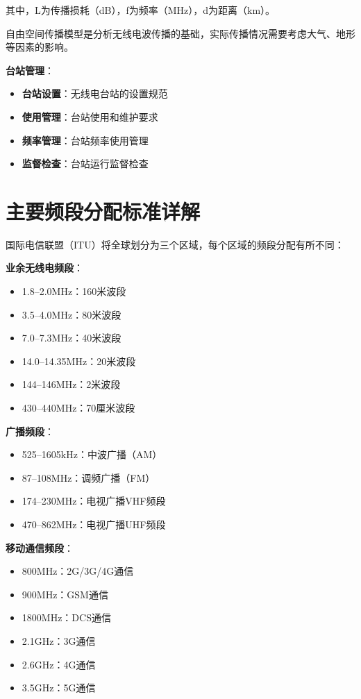 \documentclass[12pt,UTF8]{ctexbook}
\begin{document}
其中，L为传播损耗（dB），f为频率（MHz），d为距离（km）。

自由空间传播模型是分析无线电波传播的基础，实际传播情况需要考虑大气、地形等因素的影响。

\textbf{台站管理}：
\begin{itemize}[leftmargin=3.5em]
    \item \textbf{台站设置}：无线电台站的设置规范
    \item \textbf{使用管理}：台站使用和维护要求
    \item \textbf{频率管理}：台站频率使用管理
    \item \textbf{监督检查}：台站运行监督检查
\end{itemize}

\section{主要频段分配标准详解}

国际电信联盟（ITU）将全球划分为三个区域，每个区域的频段分配有所不同：

\textbf{业余无线电频段}：
\begin{itemize}[leftmargin=3.5em]
    \item 1.8--2.0MHz：160米波段
    \item 3.5--4.0MHz：80米波段
    \item 7.0--7.3MHz：40米波段
    \item 14.0--14.35MHz：20米波段
    \item 144--146MHz：2米波段
    \item 430--440MHz：70厘米波段
\end{itemize}

\textbf{广播频段}：
\begin{itemize}[leftmargin=3.5em]
    \item 525--1605kHz：中波广播（AM）
    \item 87--108MHz：调频广播（FM）
    \item 174--230MHz：电视广播VHF频段
    \item 470--862MHz：电视广播UHF频段
\end{itemize}

\textbf{移动通信频段}：
\begin{itemize}[leftmargin=3.5em]
    \item 800MHz：2G/3G/4G通信
    \item 900MHz：GSM通信
    \item 1800MHz：DCS通信
    \item 2.1GHz：3G通信
    \item 2.6GHz：4G通信
    \item 3.5GHz：5G通信
\end{itemize}
\end{document}
